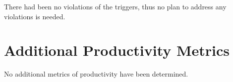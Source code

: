 \documentclass{article}
\begin{document}

There had been no violations of the triggers, thus no plan to address any violations is needed.


\section{Additional Productivity Metrics}

No additional metrics of productivity have been determined. 
\end{document}
